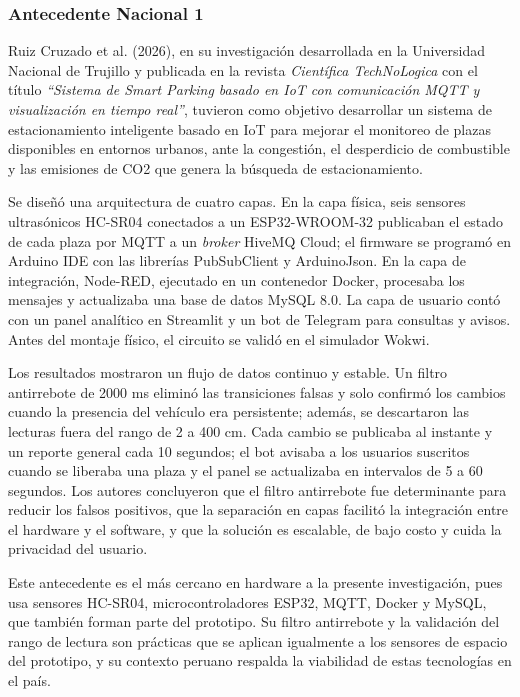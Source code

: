 \documentclass[12pt,a4paper]{article}
\begin{document}
\subsubsection{Antecedente Nacional 1}

Ruiz Cruzado et al. (2026), en su investigación desarrollada en la Universidad Nacional de Trujillo y publicada en la revista \textit{Científica TechNoLogica} con el título \textit{``Sistema de Smart Parking basado en IoT con comunicación MQTT y visualización en tiempo real''}, tuvieron como objetivo desarrollar un sistema de estacionamiento inteligente basado en IoT para mejorar el monitoreo de plazas disponibles en entornos urbanos, ante la congestión, el desperdicio de combustible y las emisiones de CO2 que genera la búsqueda de estacionamiento.

Se diseñó una arquitectura de cuatro capas. En la capa física, seis sensores ultrasónicos HC-SR04 conectados a un ESP32-WROOM-32 publicaban el estado de cada plaza por MQTT a un \textit{broker} HiveMQ Cloud; el firmware se programó en Arduino IDE con las librerías PubSubClient y ArduinoJson. En la capa de integración, Node-RED, ejecutado en un contenedor Docker, procesaba los mensajes y actualizaba una base de datos MySQL 8.0. La capa de usuario contó con un panel analítico en Streamlit y un bot de Telegram para consultas y avisos. Antes del montaje físico, el circuito se validó en el simulador Wokwi.

Los resultados mostraron un flujo de datos continuo y estable. Un filtro antirrebote de 2000 ms eliminó las transiciones falsas y solo confirmó los cambios cuando la presencia del vehículo era persistente; además, se descartaron las lecturas fuera del rango de 2 a 400 cm. Cada cambio se publicaba al instante y un reporte general cada 10 segundos; el bot avisaba a los usuarios suscritos cuando se liberaba una plaza y el panel se actualizaba en intervalos de 5 a 60 segundos. Los autores concluyeron que el filtro antirrebote fue determinante para reducir los falsos positivos, que la separación en capas facilitó la integración entre el hardware y el software, y que la solución es escalable, de bajo costo y cuida la privacidad del usuario.

Este antecedente es el más cercano en hardware a la presente investigación, pues usa sensores HC-SR04, microcontroladores ESP32, MQTT, Docker y MySQL, que también forman parte del prototipo. Su filtro antirrebote y la validación del rango de lectura son prácticas que se aplican igualmente a los sensores de espacio del prototipo, y su contexto peruano respalda la viabilidad de estas tecnologías en el país.
\end{document}
